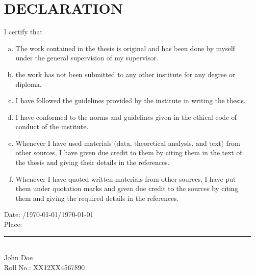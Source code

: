 
\chapter*{\centering DECLARATION}


I certify that
\begin{enumerate}[a.]
	\item The work contained in the thesis is original and has been done by myself under the general supervision of my supervisor.
	\item the work has not been submitted to any other institute for any degree or diploma.
	\item I have followed the guidelines provided by the institute in writing the thesis.
	\item I have conformed to the norms and guidelines given in the ethical code of conduct of the institute.
	\item Whenever I have used materials (data, theoretical analysis, and text) from other sources, I have given due credit to them by citing them in the text of the thesis and giving their details in the references.
	\item Whenever I have quoted written materials from other sources, I have put them under quotation marks and given due credit to the sources by citing them and giving the required details in the references.
\end{enumerate}
\vspace{4em}
\begin{minipage}[t]{0.35\textwidth}
    Date: \qquad/\thismonthdigit\today/\thisyear\today\\
    Place:
\end{minipage}%
\hfill
\begin{minipage}[t]{0.4\textwidth}
\begin{flushright}
    \bfseries
    \rule{\textwidth}{1pt}\\
	John Doe\\
	Roll No.: XX12XX4567890
\end{flushright}
\end{minipage}

\newpage
\thispagestyle{empty}
\null\newpage
